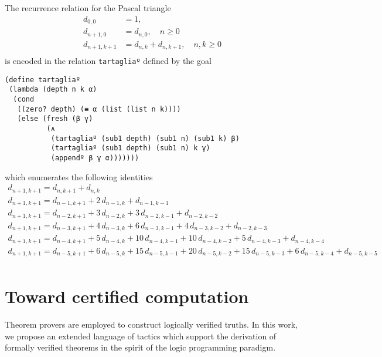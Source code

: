 \begin{example}
The recurrence relation for the Pascal triangle
\begin{displaymath}
\begin{split}
d_{0,0} &= 1, \\
d_{n+1, 0} &= d_{n,0}, \quad n \geq 0 \\
d_{n+1, k+1} &= d_{n,k} + d_{n,k+1}, \quad n,k \geq 0 \\
\end{split}
\end{displaymath}
is encoded in the relation \verb|tartagliaº| defined by the goal
\begin{verbatim}
(define tartagliaº
 (lambda (depth n k α)
  (cond
   ((zero? depth) (≡ α (list (list n k))))
   (else (fresh (β γ)
          (∧
           (tartagliaº (sub1 depth) (sub1 n) (sub1 k) β)
           (tartagliaº (sub1 depth) (sub1 n) k γ)
           (appendº β γ α)))))))
\end{verbatim}
which enumerates the following identities
\begin{displaymath}
    \begin{array}{c}
      d_{n+1,k+1} = d_{n,k+1} + d_{n,k} \\
      d_{n+1,k+1} = d_{n-1, k+1} + 2\,d_{n-1,k} + d_{n-1,k-1}  \\
      d_{n+1,k+1} = d_{n-2, k+1} + 3\,d_{n-2,k} + 3\,d_{n-2,k-1} + d_{n-2,k-2} \\
      d_{n+1,k+1} = d_{n-3, k+1} + 4\,d_{n-3,k} + 6\,d_{n-3,k-1} + 4\,d_{n-3,k-2} + d_{n-2,k-3} \\
      d_{n+1,k+1} = d_{n-4, k+1} + 5\,d_{n-4,k} + 10\,d_{n-4,k-1} + 10\,d_{n-4,k-2} + 5\,d_{n-4,k-3} + d_{n-4,k-4} \\
      d_{n+1,k+1} = d_{n-5, k+1} + 6\,d_{n-5,k} +15\,d_{n-5,k-1} + 20\,d_{n-5,k-2} +15\,d_{n-5,k-3} + 6\,d_{n-5,k-4} + d_{n-5,k-5} \\
    \end{array}
\end{displaymath}
\end{example}

\section{Toward certified computation}
\label{sec:introduction}

Theorem provers are employed to construct logically verified truths.
In this work, we propose an extended language of tactics which support
the derivation of formally verified theorems in the spirit of the
logic programming paradigm.

